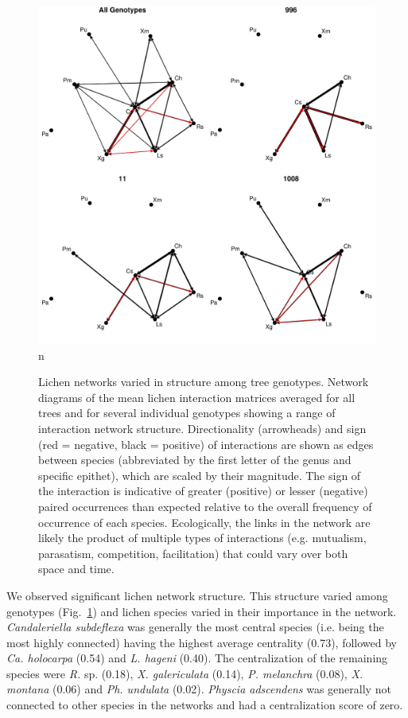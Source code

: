 \documentclass[9pt,twocolumn,twoside,lineno]{pnas-new}
\begin{document}
{\begin{figure}[ht]
\centering
\includegraphics[width=\linewidth]{cn_onc.pdf}n
\caption{Lichen networks varied in structure among tree
  genotypes. Network diagrams of the mean lichen interaction matrices
  averaged for all trees and for several individual genotypes showing
  a range of interaction network structure. Directionality
  (arrowheads) and sign (red = negative, black = positive) of
  interactions are shown as edges between species (abbreviated by the
  first letter of the genus and specific epithet), which are scaled by
  their magnitude. The sign of the interaction is indicative of
  greater (positive) or lesser (negative) paired occurrences than
  expected relative to the overall frequency of occurrence of each
  species. Ecologically, the links in the network are likely the
  product of multiple types of interactions (e.g. mutualism,
  parasatism, competition, facilitation) that could vary over both
  space and time.}
\label{fig:geno_nets}
\end{figure}


We observed significant lichen network structure. This structure
varied among genotypes (Fig.~\ref{fig:geno_nets}) and lichen species
varied in their importance in the network. \textit{Candaleriella
  subdeflexa} was generally the most central species (i.e. being the
most highly connected) having the highest average centrality (0.73),
followed by \textit{Ca. holocarpa} (0.54) and \textit{L. hageni}
(0.40). The centralization of the remaining species were \textit{R.}
sp. (0.18), \textit{X. galericulata} (0.14), \textit{P. melanchra}
(0.08), \textit{X. montana} (0.06) and \textit{Ph. undulata}
(0.02). \textit{Physcia adscendens} was generally not connected to
other species in the networks and had a centralization score of zero.

}
\end{document}
